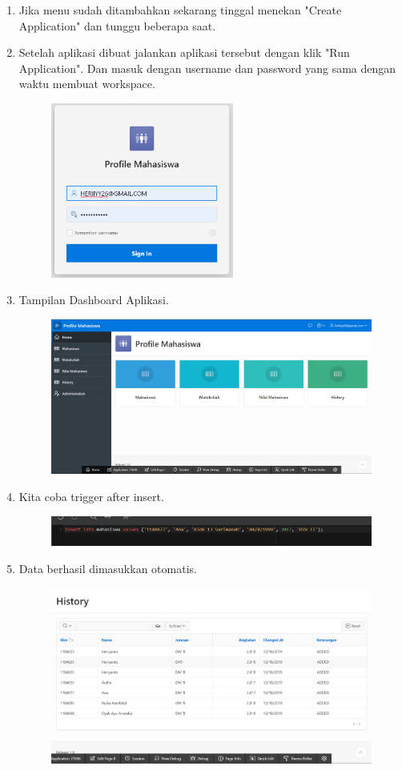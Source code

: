\documentclass[12pt, times new roman]{article}
\begin{document}
\begin{enumerate}
\begin{figure}[!htbp]
\end{figure}
\item Jika menu sudah ditambahkan sekarang tinggal menekan "Create Application" dan tunggu beberapa saat.
\item Setelah aplikasi dibuat jalankan aplikasi tersebut dengan klik "Run Application". Dan masuk dengan username dan password yang sama dengan waktu membuat workspace.
\begin{figure}[!htbp]
	\centering
	\includegraphics[width=6cm]{figures/28.png}
\end{figure}
\item Tampilan Dashboard Aplikasi.
\begin{figure}[!htbp]
	\centering
	\includegraphics[width=12cm]{figures/29.png}
\end{figure}
\item Kita coba trigger after insert.
\begin{figure}[!htbp]
	\centering
	\includegraphics[width=13cm]{figures/23.png}
\end{figure}
\item Data berhasil dimasukkan otomatis.
\begin{figure}[!htbp]
	\centering
	\includegraphics[width=12cm]{figures/24.png}

\end{figure}
\end{enumerate}
\end{document}
